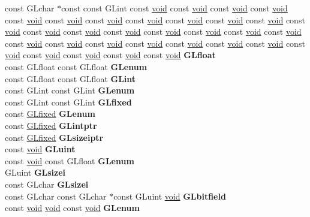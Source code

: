 \begin{DoxyCompactItemize}
\begin{tabbing}
\>const GLchar $\ast$const const GLint const \hyperlink{interfacevoid}{void} const \hyperlink{interfacevoid}{void} const \hyperlink{interfacevoid}{void} const \hyperlink{interfacevoid}{void} const \hyperlink{interfacevoid}{void} const \hyperlink{interfacevoid}{void} const \hyperlink{interfacevoid}{void} const \hyperlink{interfacevoid}{void} const \hyperlink{interfacevoid}{void} const \hyperlink{interfacevoid}{void} const \hyperlink{interfacevoid}{void} const \hyperlink{interfacevoid}{void} const \hyperlink{interfacevoid}{void} const \hyperlink{interfacevoid}{void} const \hyperlink{interfacevoid}{void} const \hyperlink{interfacevoid}{void} const \hyperlink{interfacevoid}{void} const \hyperlink{interfacevoid}{void} const \hyperlink{interfacevoid}{void} const \hyperlink{interfacevoid}{void} const \hyperlink{interfacevoid}{void} const \hyperlink{interfacevoid}{void} const \hyperlink{interfacevoid}{void} const \hyperlink{interfacevoid}{void} const \hyperlink{interfacevoid}{void} const \hyperlink{interfacevoid}{void} const \hyperlink{interfacevoid}{void} const \hyperlink{interfacevoid}{void} const \hyperlink{interfacevoid}{void} const \hyperlink{interfacevoid}{void} const \hyperlink{interfacevoid}{void} {\bfseries GLfloat}\\
\>const GLfloat const GLfloat {\bfseries GLenum}\\
\>const GLfloat const GLfloat {\bfseries GLint}\\
\>const GLint const GLint {\bfseries GLenum}\\
\>const GLint const GLint {\bfseries GLfixed}\\
\>const \hyperlink{glheader_8h_ad6d3fa892df40dedf48ee6d84529ae5e}{GLfixed} {\bfseries GLenum}\\
\>const \hyperlink{glheader_8h_ad6d3fa892df40dedf48ee6d84529ae5e}{GLfixed} {\bfseries GLintptr}\\
\>const \hyperlink{glheader_8h_ad6d3fa892df40dedf48ee6d84529ae5e}{GLfixed} {\bfseries GLsizeiptr}\\
\>const \hyperlink{interfacevoid}{void} {\bfseries GLuint}\\
\>const \hyperlink{interfacevoid}{void} const GLfloat {\bfseries GLenum}\\
\>GLuint {\bfseries GLsizei}\\
\>const GLchar {\bfseries GLsizei}\\
\>const GLchar const GLchar $\ast$const GLuint \hyperlink{interfacevoid}{void} {\bfseries GLbitfield}\\
\>const \hyperlink{interfacevoid}{void} \hyperlink{interfacevoid}{void} const \hyperlink{interfacevoid}{void} {\bfseries GLenum}\\

\end{tabbing}
\end{DoxyCompactItemize}
